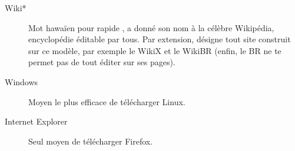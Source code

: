 \begin{description}
  \item[Wiki*] Mot hawa\"ien pour \og rapide \fg, a donné son nom à la célèbre Wikipédia, encyclopédie éditable par tous.
  Par extension, désigne tout site construit sur ce modèle, par exemple le WikiX et le WikiBR (enfin, le BR ne te permet pas de tout éditer sur ses pages).
  
  \item[Windows] Moyen le plus efficace de télécharger Linux.
  
  \item[Internet Explorer] Seul moyen de télécharger Firefox.
  
\end{description}
